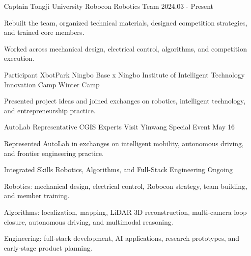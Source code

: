 
\begingroup
\renewcommand{\acvSectionContentTopSkip}{.2mm}
\renewcommand*{\descriptionstyle}[1]{{\fontsize{8.7pt}{1.15em}\bodyfontlight\color{text} #1}}
\begin{cventries}

  \cventry
    {Captain}
    {Tongji University Robocon Robotics Team}
    {}
    {2024.03 - Present}
    {
      \begin{cvitems}
        \item {Rebuilt the team, organized technical materials, designed competition strategies, and trained core members.}
        \item {Worked across mechanical design, electrical control, algorithms, and competition execution.}
      \end{cvitems}
    }

  \cventry
    {Participant}
    {XbotPark Ningbo Base x Ningbo Institute of Intelligent Technology Innovation Camp}
    {}
    {Winter Camp}
    {
      \begin{cvitems}
        \item {Presented project ideas and joined exchanges on robotics, intelligent technology, and entrepreneurship practice.}
      \end{cvitems}
    }

  \cventry
    {AutoLab Representative}
    {CGIS Experts Visit Yinwang Special Event}
    {}
    {May 16}
    {
      \begin{cvitems}
        \item {Represented AutoLab in exchanges on intelligent mobility, autonomous driving, and frontier engineering practice.}
      \end{cvitems}
    }

  \cventry
    {Integrated Skills}
    {Robotics, Algorithms, and Full-Stack Engineering}
    {}
    {Ongoing}
    {
      \begin{cvitems}
        \item {Robotics: mechanical design, electrical control, Robocon strategy, team building, and member training.}
        \item {Algorithms: localization, mapping, LiDAR 3D reconstruction, multi-camera loop closure, autonomous driving, and multimodal reasoning.}
        \item {Engineering: full-stack development, AI applications, research prototypes, and early-stage product planning.}
      \end{cvitems}
    }

\end{cventries}
\endgroup
